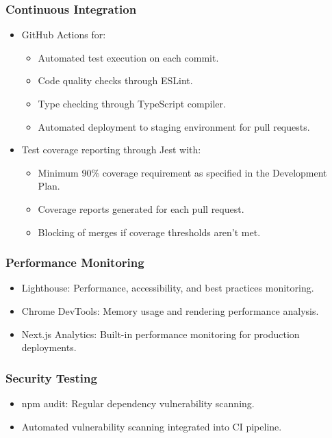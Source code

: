 \documentclass[12pt, titlepage]{article}
\begin{document}
\subsubsection*{Continuous Integration}
\begin{itemize}
    \item GitHub Actions for:
    \begin{itemize}
        \item Automated test execution on each commit.
        \item Code quality checks through ESLint.
        \item Type checking through TypeScript compiler.
        \item Automated deployment to staging environment for pull requests.
    \end{itemize}
    \item Test coverage reporting through Jest with:
    \begin{itemize}
        \item Minimum 90\% coverage requirement as specified in the Development Plan.
        \item Coverage reports generated for each pull request.
        \item Blocking of merges if coverage thresholds aren't met.
    \end{itemize}
\end{itemize}

\subsubsection*{Performance Monitoring}
\begin{itemize}
    \item Lighthouse: Performance, accessibility, and best practices monitoring.
    \item Chrome DevTools: Memory usage and rendering performance analysis.
    \item Next.js Analytics: Built-in performance monitoring for production deployments.
\end{itemize}

\subsubsection*{Security Testing}
\begin{itemize}
    \item npm audit: Regular dependency vulnerability scanning.
    \item Automated vulnerability scanning integrated into CI pipeline.
\end{itemize}
\end{document}
